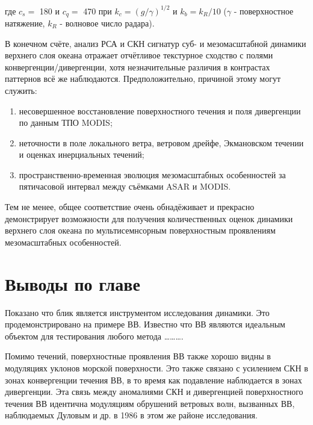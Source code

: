 \noindent где $c_{s} =$ 180 и $c_{q} =$ 470 при $k_{c} =(g/\gamma )^{1/2} $ и $k_{b} =k_{R} /10$ ($\gamma $ - поверхностное натяжение, $k_{R} $ - волновое число радара).

В конечном счёте, анализ РСА и СКН сигнатур суб- и мезомасштабной динамики верхнего слоя океана отражает отчётливое текстурное сходство с полями конвергенции/дивергенции, хотя незначительные различия в контрастах паттернов всё же наблюдаются. Предположительно, причиной этому могут служить:

\begin{enumerate}
\item  несовершенное восстановление поверхностного течения и поля дивергенции по данным ТПО MODIS;

\item  неточности в поле локального ветра, ветровом дрейфе, Экмановском течении и оценках инерциальных течений;

\item  пространственно-временная эволюция мезомасштабных особенностей за пятичасовой интервал между съёмками ASAR и MODIS.
\end{enumerate}

Тем не менее, общее соответствие очень обнадёживает и прекрасно демонстрирует возможности для получения количественных оценок динамики верхнего слоя океана по мультисемнсорным поверхностным проявлениям мезомасштабных особенностей.



\newpage


\section{Выводы по главе} \label{sec:3.4}


Показано что блик является инструментом исследования динамики. Это продемонстрировано на примере ВВ. Известно что ВВ являются идеальным объектом для тестирования любого метода \dots \dots \dots .

Помимо течений, поверхностные проявления ВВ также хорошо видны в модуляциях уклонов морской поверхности. Это также связано с усилением СКН в зонах конвергенции течения ВВ, в то время как подавление наблюдается в зонах дивергенции. Эта связь между аномалиями СКН и дивергенцией поверхностного течения ВВ идентична модуляциям обрушений ветровых волн, вызванных ВВ, наблюдаемых Дуловым и др. в 1986 \citep{1986} в этом же районе исследования.



